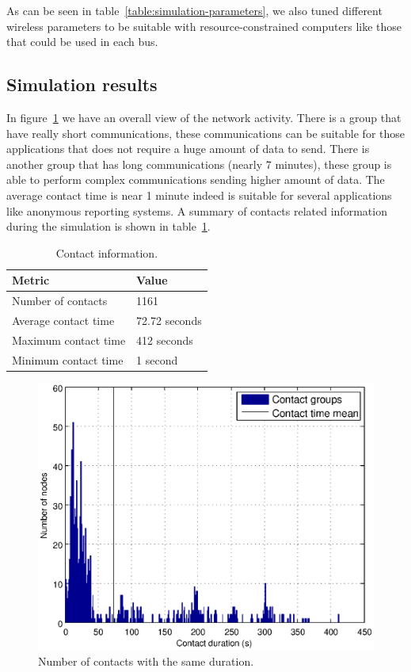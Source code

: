 As can be seen in table~\ref{table:simulation-parameters}, we also tuned different wireless parameters to be suitable with resource-constrained computers like those that could be used in each bus.

\subsection{Simulation results}


In figure~\ref{fig:contact-duration-group} we have an overall view of the network activity. There is a group that have really short communications, these communications can be suitable for those applications that does not require a huge amount of data to send. There is another group that has long communications (nearly 7 minutes), these group is able to perform complex communications sending higher amount of data. The average contact time is near 1 minute indeed is suitable for several applications like anonymous reporting systems. A summary of contacts related information during the simulation is shown in table~\ref{table:contact-information}.

\begin{table}[h]
\centering
\begin{tabular}{l|l}
Metric & Value \\
\hline
Number of contacts & 1161 \\
Average contact time  & 72.72 seconds \\
Maximum contact time &  412 seconds\\
Minimum contact time &  1 second
\end{tabular}
\caption{Contact information.}
\label{table:contact-information}
\end{table}

\begin{figure}[hbt]
  \centering
  \includegraphics[scale=0.70]{imgs/statistics/contats-duration}
  \caption{Number of contacts with the same duration.}
  \label{fig:contact-duration-group}
\end{figure}


